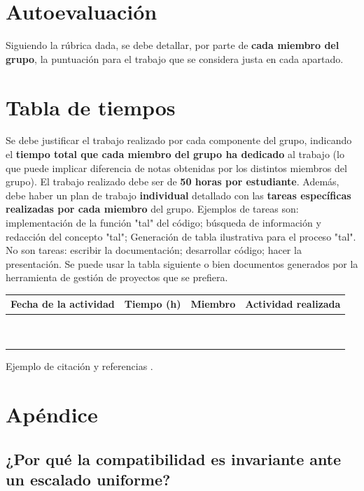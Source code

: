 \documentclass[a4paper]{article}
\theoremstyle{plain} %
\theoremstyle{plain} %
\begin{document}
\section{Autoevaluación}

Siguiendo la rúbrica dada, se debe detallar, por parte de  \textbf{cada miembro del grupo}, la puntuación para el trabajo que se considera justa en cada apartado. 

\section{Tabla de tiempos}


Se debe justificar el trabajo realizado por cada componente del grupo, indicando el {\bf tiempo total que cada miembro del grupo ha dedicado} al trabajo (lo que puede implicar diferencia de notas obtenidas por los distintos miembros del grupo). El trabajo realizado debe ser de {\bf 50 horas por estudiante}. Además, debe haber un plan de trabajo \textbf{individual} detallado con las {\bf tareas específicas realizadas por cada miembro} del grupo. Ejemplos de tareas son: implementación de la función "tal" del código; búsqueda de información y redacción del concepto "tal"; Generación de tabla ilustrativa para el proceso "tal". No son tareas: escribir la documentación; desarrollar código; hacer la presentación. Se puede usar la tabla siguiente o bien documentos generados por la herramienta de gestión de proyectos que se prefiera.

\begin{center}
\begin{tabular}{|c|c|c|c|}
\hline
 Fecha de la
 actividad 
& Tiempo (h)
& Miembro
& Actividad realizada
\\\hline
\mbox{ }&\mbox{}&\mbox{ }&\mbox{}\\
\mbox{ }&\mbox{}&\mbox{ }&\mbox{}\\\hline
\end{tabular}
\end{center}

\nocite{*}
\printbibliography[title={Referencias}]

Ejemplo de citación \cite{articulopomeranz} y referencias \cite{nuestrorepo}.


\section{Apéndice}
\subsection{¿Por qué la compatibilidad es invariante ante un escalado uniforme?}
\label{invarianteCompatibilidad}
\end{document}
